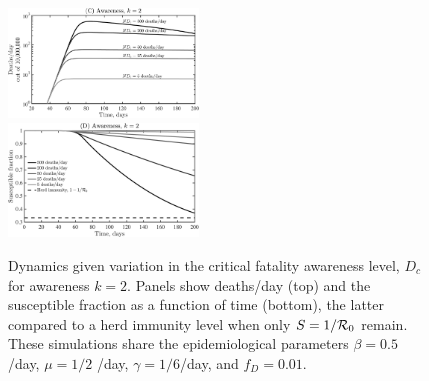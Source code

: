 \begin{figure}[t!]
\begin{center}
\includegraphics[width=0.45\textwidth]{figseir_Speak_k2_noname.pdf}\\
\includegraphics[width=0.45\textwidth]{figseir_Susc_k2_noname.pdf}
\caption{Dynamics given variation in the critical fatality awareness
level, $D_c$ for awareness $k=2$. Panels show
deaths/day (top) and the susceptible fraction as a function of time (bottom),
the latter compared to a herd immunity
level when only $S=1/{\cal{R}}_0$ remain.
These simulations share the
epidemiological parameters 
$\beta=0.5$ /day, $\mu=1/2$ /day, $\gamma=1/6$/day,
and $f_D=0.01$.
\label{fig.generic}}
\end{center}
\end{figure}

